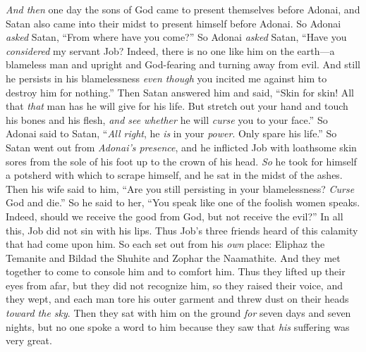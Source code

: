 \begin{biblechapter} %
 \textit{And then} one day the sons of God came to present themselves before Adonai, and Satan also came into their midst to present himself before Adonai.
\verse So Adonai \textit{asked} Satan, “From where have you come?”
\verse So Adonai \textit{asked} Satan, “Have you \textit{considered} my servant Job? Indeed, there is no one like him on the earth—a blameless man and upright and God-fearing and turning away from evil. And still he persists in his blamelessness \textit{even though} you incited me against him to destroy him for nothing.”
\verse Then Satan answered him and said, “Skin for skin! All that \textit{that} man has he will give for his life.
\verse But stretch out your hand and touch his bones and his flesh, \textit{and see} \textit{whether} he will \textit{curse} you to your face.”
\verse So Adonai said to Satan, “\textit{All right}, he \textit{is} in your \textit{power}. Only spare his life.”
 So Satan went out from \textit{Adonai’s presence}, and he inflicted Job with loathsome skin sores from the sole of his foot up to the crown of his head.
\verse \textit{So} he took for himself a potsherd with which to scrape himself, and he sat in the midst of the ashes.
\verse Then his wife said to him, “Are you still persisting in your blamelessness? \textit{Curse} God and die.”
\verse So he said to her, “You speak like one of the foolish women speaks. Indeed, should we receive the good from God, but not receive the evil?” In all this, Job did not sin with his lips.
\verse Thus Job’s three friends heard of this calamity that had come upon him. So each set out from his \textit{own} place: Eliphaz the Temanite and Bildad the Shuhite and Zophar the Naamathite. And they met together to come to console him and to comfort him.
\verse Thus they lifted up their eyes from afar, but they did not recognize him, so they raised their voice, and they wept, and each man tore his outer garment and threw dust on their heads \textit{toward the sky}.
\verse Then they sat with him on the ground \textit{for} seven days and seven nights, but no one spoke a word to him because they saw that \textit{his} suffering was very great.
\end{biblechapter}

